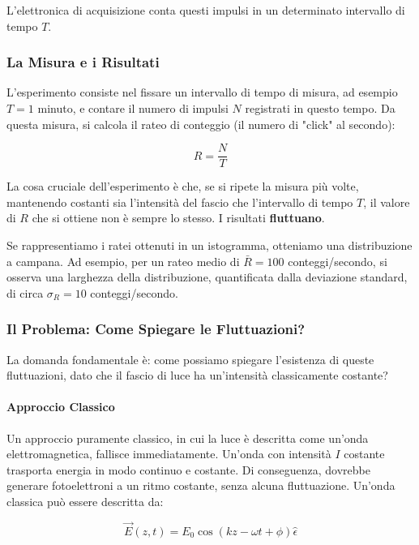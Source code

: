 L'elettronica di acquisizione conta questi impulsi in un determinato intervallo di tempo $T$.

\subsubsection*{La Misura e i Risultati}

L'esperimento consiste nel fissare un intervallo di tempo di misura, ad esempio $T = 1$ minuto, e contare il numero di impulsi $N$ registrati in questo tempo. Da questa misura, si calcola il rateo di conteggio (il numero di "click" al secondo):

\begin{equation}
 R = \frac{N}{T}
\end{equation}

La cosa cruciale dell'esperimento è che, se si ripete la misura più volte, mantenendo costanti sia l'intensità del fascio che l'intervallo di tempo $T$, il valore di $R$ che si ottiene non è sempre lo stesso. I risultati \textbf{fluttuano}.

Se rappresentiamo i ratei ottenuti in un istogramma, otteniamo una distribuzione a campana. Ad esempio, per un rateo medio di $\bar{R} = 100$ conteggi/secondo, si osserva una larghezza della distribuzione, quantificata dalla deviazione standard, di circa $\sigma_R = 10$ conteggi/secondo.

\subsubsection*{Il Problema: Come Spiegare le Fluttuazioni?}

La domanda fondamentale è: come possiamo spiegare l'esistenza di queste fluttuazioni, dato che il fascio di luce ha un'intensità classicamente costante?

\paragraph{Approccio Classico}
Un approccio puramente classico, in cui la luce è descritta come un'onda elettromagnetica, fallisce immediatamente. Un'onda con intensità $I$ costante trasporta energia in modo continuo e costante. Di conseguenza, dovrebbe generare fotoelettroni a un ritmo costante, senza alcuna fluttuazione. Un'onda classica può essere descritta da:

\begin{equation}
 \vec{E}(z,t) = E_0 \cos(kz - \omega t + \phi) \hat{\epsilon}
\end{equation}

